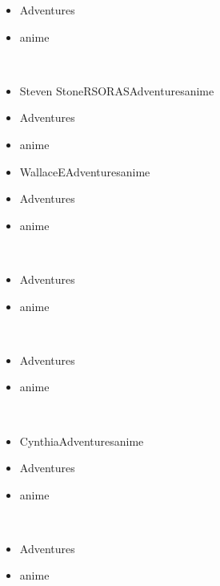 \documentclass[a4paper,12pt]{article}
\begin{document}
\begin{itemize}
\item Adventures
\item anime
\end{itemize}\\ \par \vspace{0.5cm}

\begin{itemize}
\item Steven StoneRSORASAdventuresanime
\item Adventures
\item anime
\item WallaceEAdventuresanime
\item Adventures
\item anime
\end{itemize}\\ \par \vspace{0.5cm}

\begin{itemize}
\item Adventures
\item anime
\end{itemize}\\ \par \vspace{0.5cm}

\begin{itemize}
\item Adventures
\item anime
\end{itemize}\\ \par \vspace{0.5cm}

\begin{itemize}
\item CynthiaAdventuresanime
\item Adventures
\item anime
\end{itemize}\\ \par \vspace{0.5cm}

\begin{itemize}
\item Adventures
\item anime
\end{itemize}\\ \par \vspace{0.5cm}
\end{document}
